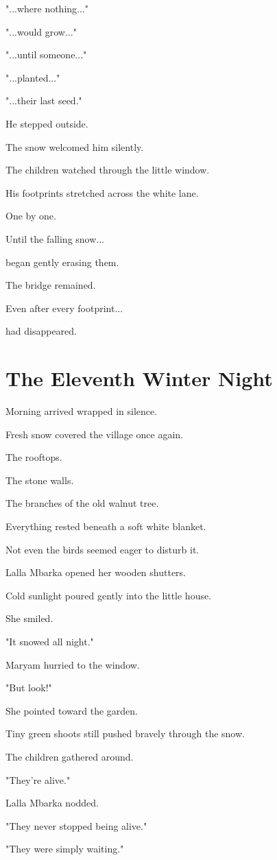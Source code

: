 \documentclass[12pt,openany]{book}
\begin{document}
"...where nothing..."

"...would grow..."

"...until someone..."

"...planted..."

"...their last seed."

He stepped outside.

The snow welcomed him silently.

The children watched through the little window.

His footprints stretched across the white lane.

One by one.

Until the falling snow...

began gently erasing them.

The bridge remained.

Even after every footprint...

had disappeared.
\chapter{The Eleventh Winter Night}

Morning arrived wrapped in silence.

Fresh snow covered the village once again.

The rooftops.

The stone walls.

The branches of the old walnut tree.

Everything rested beneath a soft white blanket.

Not even the birds seemed eager to disturb it.

Lalla Mbarka opened her wooden shutters.

Cold sunlight poured gently into the little house.

She smiled.

"It snowed all night."

Maryam hurried to the window.

"But look!"

She pointed toward the garden.

Tiny green shoots still pushed bravely through the snow.

The children gathered around.

"They're alive."

Lalla Mbarka nodded.

"They never stopped being alive."

"They were simply waiting."
\end{document}
